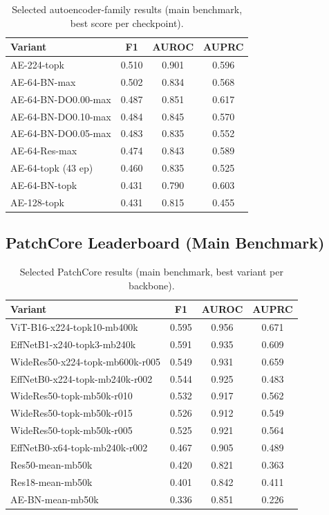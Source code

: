 \documentclass[11pt]{article}
\begin{document}
\begin{table}[H]
\centering
\caption{Selected autoencoder-family results (main benchmark, best score per checkpoint).}
\label{tab:appendix_ae}
\begin{tabular}{lccc}
\toprule
Variant & F1 & AUROC & AUPRC \\
\midrule
AE-224-topk               & 0.510 & 0.901 & 0.596 \\
AE-64-BN-max              & 0.502 & 0.834 & 0.568 \\
AE-64-BN-DO0.00-max       & 0.487 & 0.851 & 0.617 \\
AE-64-BN-DO0.10-max       & 0.484 & 0.845 & 0.570 \\
AE-64-BN-DO0.05-max       & 0.483 & 0.835 & 0.552 \\
AE-64-Res-max             & 0.474 & 0.843 & 0.589 \\
AE-64-topk (43 ep)        & 0.460 & 0.835 & 0.525 \\
AE-64-BN-topk             & 0.431 & 0.790 & 0.603 \\
AE-128-topk               & 0.431 & 0.815 & 0.455 \\
\bottomrule
\end{tabular}
\end{table}

\subsection{PatchCore Leaderboard (Main Benchmark)}

\begin{table}[H]
\centering
\caption{Selected PatchCore results (main benchmark, best variant per backbone).}
\label{tab:appendix_patchcore}
\begin{tabular}{lccc}
\toprule
Variant & F1 & AUROC & AUPRC \\
\midrule
ViT-B16-x224-topk10-mb400k        & 0.595 & 0.956 & 0.671 \\
EffNetB1-x240-topk3-mb240k        & 0.591 & 0.935 & 0.609 \\
WideRes50-x224-topk-mb600k-r005   & 0.549 & 0.931 & 0.659 \\
EffNetB0-x224-topk-mb240k-r002    & 0.544 & 0.925 & 0.483 \\
WideRes50-topk-mb50k-r010         & 0.532 & 0.917 & 0.562 \\
WideRes50-topk-mb50k-r015         & 0.526 & 0.912 & 0.549 \\
WideRes50-topk-mb50k-r005         & 0.525 & 0.921 & 0.564 \\
EffNetB0-x64-topk-mb240k-r002     & 0.467 & 0.905 & 0.489 \\
Res50-mean-mb50k                  & 0.420 & 0.821 & 0.363 \\
Res18-mean-mb50k                  & 0.401 & 0.842 & 0.411 \\
AE-BN-mean-mb50k                  & 0.336 & 0.851 & 0.226 \\
\bottomrule
\end{tabular}
\end{table}
\end{document}
